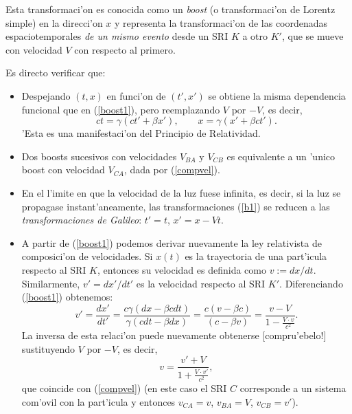 Esta transformaci'on es conocida como un \textit{boost} (o transformaci'on de Lorentz simple) en la direcci'on $x$ y representa la transformaci'on de las coordenadas espaciotemporales \textit{de un mismo evento} desde un SRI $K$ a otro $K'$, que se mueve con velocidad $V$ con respecto al primero.

Es directo verificar que:
\begin{itemize}
\item Despejando $(t,x)$ en funci'on de $(t',x')$ se obtiene la misma
dependencia funcional que en (\ref{boost1}), pero reemplazando $V$ por $-V$, es decir,
\begin{equation}
\boxed{ct=\gamma (ct'+\beta x'), \qquad x=\gamma(x'+\beta ct').} \label{boost2}
\end{equation}
'Esta es una manifestaci'on del Principio de Relatividad.

\item Dos boosts sucesivos con velocidades $V_{BA}$ y $V_{CB}$ es
equivalente a un 'unico boost con velocidad $V_{CA}$, dada por (\ref{compvel}).

\item En el l'imite en que la velocidad de la luz fuese infinita, es decir, si la luz se propagase instant'aneamente, las transformaciones (\ref{b1}) se reducen a las \textit{transformaciones de Galileo}: $t'=t$, $x'=x-Vt$.

\item A partir de (\ref{boost1}) podemos derivar nuevamente la ley relativista de composici'on de velocidades. Si $x(t)$ es la trayectoria de una part'icula respecto al SRI $K$, entonces su velocidad es definida como $v:=dx/dt$. Similarmente, $v'=dx'/dt'$ es la velocidad respecto al SRI $K'$. Diferenciando (\ref{boost1})  obtenemos:
\begin{equation}
 v'=\frac{dx'}{dt'}=\frac{c\gamma(dx-\beta c dt)}{\gamma(cdt-\beta dx)}=\frac{c(v-\beta c)}{(c-\beta v)}=\frac{v-V}{1-\frac{V\cdot v}{c^2}}.
\end{equation}
La inversa de esta relaci'on puede nuevamente obtenerse [compru'ebelo!] sustituyendo $V$ por $-V$, es decir,
\begin{equation}
v=\frac{v'+V}{1+\frac{V\cdot v'}{c^2}},
\end{equation}
que coincide con (\ref{compvel}) (en este caso el SRI $C$ corresponde a un sistema com'ovil con la part'icula y entonces $v_{CA}=v$, $v_{BA}=V$, $v_{CB}=v'$).


\end{itemize}
